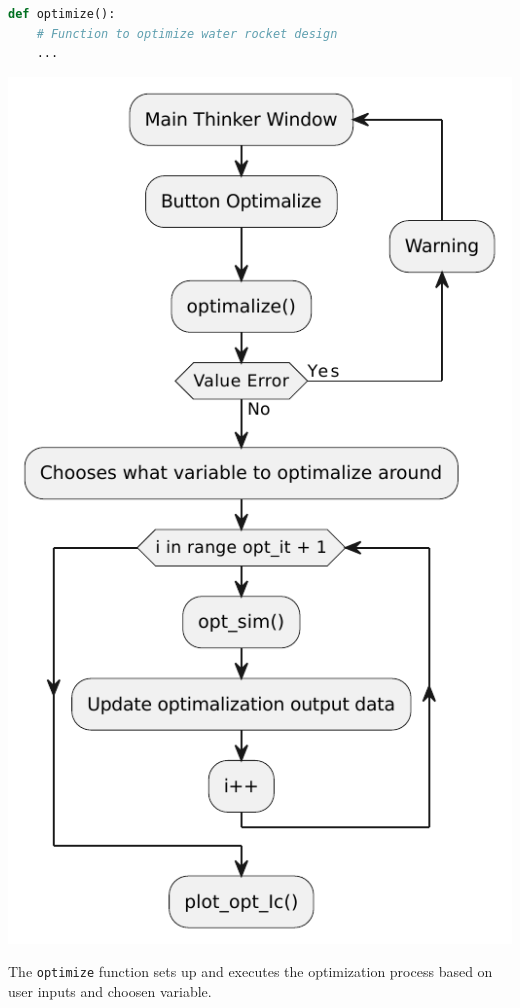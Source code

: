 \documentclass{report}
\begin{document}
\begin{lstlisting}[language=Python]
def optimize():
    # Function to optimize water rocket design
    ...
\end{lstlisting}
\begin{center}
\includegraphics[scale=0.6]{optimalization}
\end{center}

The \texttt{optimize} function sets up and executes the optimization process based on user inputs and choosen variable.
\end{document}
